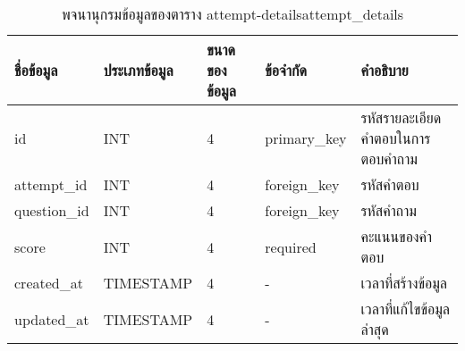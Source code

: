 \begin{table}[H]
    \caption{พจนานุกรมข้อมูลของตาราง attempt-detailsattempt_details}
    \label{tab:database-attempt-details}
    \begin{tabularx}{\textwidth}{ | p{2.25cm} | p{2.20cm} | p{2.45cm} | p{2cm} | X | }
    \hline
    \textbf{ชื่อข้อมูล} & \textbf{ประเภทข้อมูล} & \textbf{ขนาดของข้อมูล} & \textbf{ข้อจำกัด} & \textbf{คำอธิบาย} \\
    \hline
    id & INT & 4 & primary\_key & รหัสรายละเอียดคำตอบในการตอบคำถาม \\
    \hline
    attempt\_id & INT & 4 & foreign\_key & รหัสคำตอบ \\
    \hline
    question\_id & INT & 4 & foreign\_key & รหัสคำถาม \\
    \hline
    score & INT & 4 & required & คะแนนของคำตอบ \\
    \hline
    created\_at & TIMESTAMP & 4 & - & เวลาที่สร้างข้อมูล \\
    \hline
    updated\_at & TIMESTAMP & 4 & - & เวลาที่แก้ไขข้อมูลล่าสุด \\
    \hline
    \end{tabularx}
\end{table}